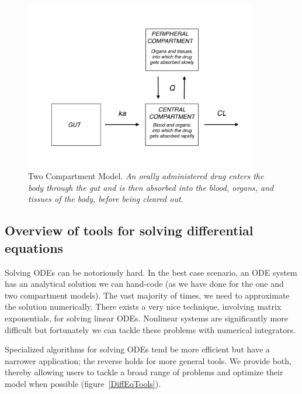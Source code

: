 \documentclass[11pt]{article}
\begin{document}
\begin{figure}[!htb]
\begin{center}
\includegraphics[width=4in,trim=0in 0in 0 0in]{graphics/TwoCptNice.png}
\caption{{Two Compartment Model. \textit{An orally administered drug enters the body through
the gut and is then absorbed into the blood, organs, and tissues of the body, before being cleared out.}}}
\label{TwoCptNice}
\end{center}
\end{figure}

\subsection{Overview of tools for solving differential equations}

Solving ODEs can be notoriously hard.
%
In the best case scenario, an ODE system has an analytical solution we can hand-code
(as we have done for the one and two compartment models). The vast majority of times,
we need to approximate the solution numerically. There exists a very nice technique, 
involving matrix exponentials, for solving linear ODEs. Nonlinear systems are significantly 
more difficult but fortunately we can tackle these problems with numerical integrators.

Specialized algorithms for solving ODEs tend be more efficient but have a narrower application; 
the reverse holds for more general tools. We provide both, thereby allowing users to tackle a 
broad range of problems and optimize their model when possible  (figure~\ref{DiffEqTools}).
\end{document}
